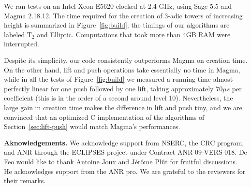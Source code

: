 \documentclass{sig-alternate}
\begin{document}
We ran tests on an Intel Xeon E5620 clocked at 2.4 GHz, using Sage 5.5
and Magma 2.18.12. The time required for the creation of $3$-adic
towers of increasing height is summarized in
Figure~\ref{fig:build}; the timings of our algorithms are labeled 
T$_2$ and Elliptic. Computations that took more than 4GB RAM were
interrupted.

Despite its simplicity, our code consistently outperforms Magma on
creation time. On the other hand, lift and push operations take
essentially no time in Magma, while in all the tests of
Figure~\ref{fig:build} we measured a running time almost perfectly
linear for one push followed by one lift, taking approximately $70\mu
s$ per coefficient (this is in the order of a second around level
10). Nevertheless, the large gain in creation time makes the
difference in lift and push tiny, and we are convinced that an
optimized C implementation of the algorithms of
Section~\ref{sec:lift-push} would match Magma's performances.


\bigskip\noindent \textbf{Aknowledgements.}  We acknowledge support
from NSERC, the CRC program, and ANR through the ECLIPSES project
under Contract ANR-09-VERS-018. De Feo would like to thank Antoine
Joux and J\'er\^ome Pl\^ut for fruitful discussions. He acknowledges
support from the ANR pro. We are grateful to the reviewers for their
remarks.

\scriptsize


\end{document}
